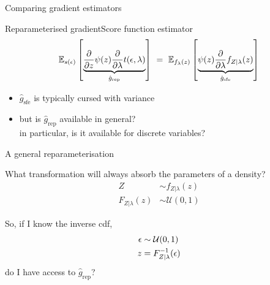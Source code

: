 \begin{frame}{Comparing gradient estimators}

	Reparameterised gradient\hfill Score function estimator
	\begin{equation*}
		\mathbb E_{s(\epsilon)}\left[ \underbrace{\pdv{z} \psi(z) \pdv{\lambda} t(\epsilon, \lambda)}_{\hat g_{\text{rep}}} \right]  ~ = ~ \mathbb E_{f_{\lambda}(z)}\left[\underbrace{\psi(z) \pdv{\lambda} f_{Z|\lambda}(z)}_{\hat g_{\text{sfe}}} \right]
	\end{equation*}
	
	
	\begin{itemize}

		\item $\hat g_{\text{sfe}}$ is typically cursed with variance
		\item but is $\hat g_{\text{rep}}$ available in general? \\ \pause
		 in particular, is it available for discrete variables?
	\end{itemize}
\end{frame}

\begin{frame}{A general reparameterisation}

	What transformation will always absorb the parameters of a density? \pause
	\begin{equation*}
		\begin{aligned}
			Z &\sim f_{Z|\lambda}(z) \\
			F_{Z|\lambda}(z) &\sim \mathcal U(0, 1)			
		\end{aligned}
	\end{equation*}
	
	\pause
	
	So, if I know the inverse cdf, 
	\begin{equation*}
		\begin{aligned}
		\epsilon &\sim \mathcal U(0, 1) \\
		z &= {F}^{-1}_{Z|\lambda}(\epsilon) 
		\end{aligned}
	\end{equation*}
	do I have access to $\hat g_{\text{rep}}$?
\end{frame}



